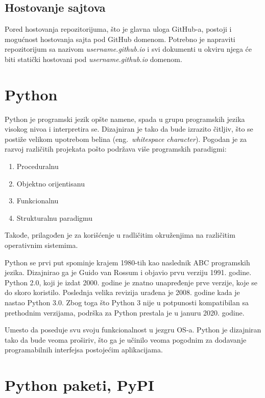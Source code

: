 \documentclass[12pt]{report}
\begin{document}
\subsection{Hostovanje sajtova}
Pored hostovanja repozitorijuma, što je glavna uloga GitHub-a, postoji i mogućnost hostovanja sajta pod GitHub domenom. Potrebno je napraviti repozitorijum sa nazivom \textit{username.github.io} i svi dokumenti u okviru njega će biti statički hostovani pod \textit{username.github.io} domenom.

\section{Python}

Python \cite{python} je programski jezik opšte namene, spada u grupu programskih jezika visokog nivoa i interpretira se. Dizajniran je tako da bude izrazito čitljiv, što se postiže velikom upotrebom belina (eng.\ \textit{whitespace character}). Pogodan je za razvoj različitih projekata pošto podržava više programskih paradigmi:

\begin{enumerate}
    \item Proceduralnu
    \item Objektno orijentisanu
    \item Funkcionalnu
    \item Strukturalnu paradigmu
\end{enumerate}

Takođe, prilagođen je za korišćenje u radličitim okruženjima na različitim operativnim sistemima.

Python se prvi put spominje krajem 1980-tih kao naslednik ABC programskih jezika. Dizajnirao ga je Guido van Rossum i objavio prvu verziju 1991. godine. Python 2.0, koji je izdat 2000. godine je znatno unapređenje prve verzije, koje se do skoro koristilo.  Poslednja velika revizija urađena je 2008. godine kada je nastao Python 3.0. Zbog toga što Python 3 nije u potpunosti kompatibilan sa prethodnim verzijama, podrška za Python prestala je u januru 2020. godine.

Umesto da poseduje svu svoju funkcionalnost u jezgru OS-a. Python je dizajniran tako da  bude veoma proširiv, što ga je učinilo veoma pogodnim za dodavanje programabilnih interfejsa postojećim aplikacijama.

\section{Python paketi, PyPI}
\end{document}
